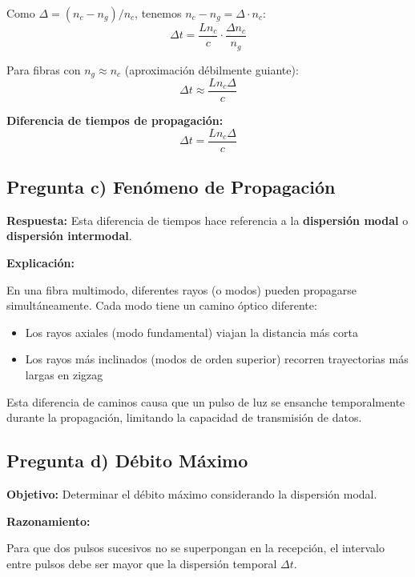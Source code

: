 \documentclass[11pt,a4paper]{article}
\begin{document}
Como $\Delta = (n_c - n_g)/n_c$, tenemos $n_c - n_g = \Delta \cdot n_c$:
\begin{equation}
    \Delta t = \frac{Ln_c}{c} \cdot \frac{\Delta n_c}{n_g}
\end{equation}

Para fibras con $n_g \approx n_c$ (aproximación débilmente guiante):
\begin{equation}
    \Delta t \approx \frac{Ln_c\Delta}{c}
\end{equation}

\textbf{Diferencia de tiempos de propagación:}
\begin{equation}
    \Delta t = \frac{Ln_c\Delta}{c}
\end{equation}

\subsection{Pregunta c) Fenómeno de Propagación}

\textbf{Respuesta:} Esta diferencia de tiempos hace referencia a la \textbf{dispersión modal} o \textbf{dispersión intermodal}.

\textbf{Explicación:}

En una fibra multimodo, diferentes rayos (o modos) pueden propagarse simultáneamente. Cada modo tiene un camino óptico diferente:
\begin{itemize}
    \item Los rayos axiales (modo fundamental) viajan la distancia más corta
    \item Los rayos más inclinados (modos de orden superior) recorren trayectorias más largas en zigzag
\end{itemize}

Esta diferencia de caminos causa que un pulso de luz se ensanche temporalmente durante la propagación, limitando la capacidad de transmisión de datos.

\subsection{Pregunta d) Débito Máximo}

\textbf{Objetivo:} Determinar el débito máximo considerando la dispersión modal.

\textbf{Razonamiento:}

Para que dos pulsos sucesivos no se superpongan en la recepción, el intervalo entre pulsos debe ser mayor que la dispersión temporal $\Delta t$.
\end{document}
